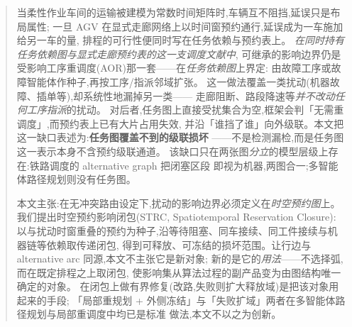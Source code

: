 \documentclass[manuscript,screen,review]{acmart}
\providecommand{\STRC}{\textsc{STRC}}
\begin{document}
\begin{abstract}
当柔性作业车间的运输被建模为常数时间矩阵时,车辆互不阻挡,延误只是布局属性;
一旦 AGV 在显式走廊网络上以时间窗预约通行,延误成为一车施加给另一车的量,
排程的可行性便同时写在任务依赖与预约表上。
\emph{在同时持有任务依赖图与显式走廊预约表的这一支调度文献中},
可继承的影响边界仍是受影响工序重调度(AOR)那一套——在\emph{任务依赖图}上界定:
由故障工序或故障智能体作种子,再按工序/指派邻域扩张。
这一做法覆盖一类扰动(机器故障、插单等),却系统性地漏掉另一类——
走廊阻断、路段降速等\emph{并不改动任何工序指派}的扰动。
对后者,任务图上直接受扰集合为空,框架会判「无需重调度」,而预约表上已有大片占用失效,
并沿「谁挡了谁」向外级联。本文把这一缺口表述为:\textbf{任务图覆盖不到的级联损坏}
——不是检测漏检,而是任务图这一表示本身不含预约级联通道。
该缺口只在两张图\emph{分立}的模型层级上存在:铁路调度的 alternative graph 把闭塞区段
即视为机器,两图合一;多智能体路径规划则没有任务图。

本文主张:在无冲突路由设定下,扰动的影响边界必须定义在\emph{时空预约图}上。
我们提出时空预约影响闭包(\STRC, Spatiotemporal Reservation Closure):
以与扰动时窗重叠的预约为种子,沿等待阻塞、同车接续、同工件接续与机器链等依赖取传递闭包,
得到可释放、可冻结的损坏范围。让行边与 alternative arc 同源,本文不主张它是新对象;
新的是它的\emph{用法}——不选择弧,而在既定排程之上取闭包,
使影响集从算法过程的副产品变为由图结构唯一确定的对象。
在闭包上做有界修复(改路,失败则扩大释放域)是把该对象用起来的手段;
「局部重规划 + 外侧冻结」与「失败扩域」两者在多智能体路径规划与局部重调度中均已是标准
做法,本文不以之为创新。


\end{abstract}
\end{document}
